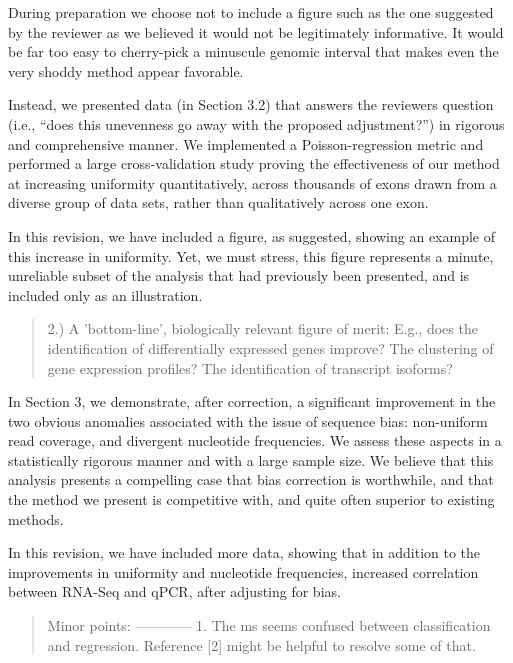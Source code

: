 \documentclass{article}
\begin{document}
During preparation we choose not to include a figure such as the one suggested
by the reviewer as we believed it would not be legitimately informative. It
would be far too easy to cherry-pick a minuscule genomic interval that makes
even the very shoddy method appear favorable.

Instead, we presented data (in Section 3.2) that answers the reviewers question
(i.e., ``does this unevenness go away with the proposed adjustment?'') in
rigorous and comprehensive manner. We implemented a Poisson-regression metric
and performed a large cross-validation study proving the effectiveness of our
method at increasing uniformity quantitatively, across thousands of exons drawn
from a diverse group of data sets, rather than qualitatively across one exon.

In this revision, we have included a figure, as suggested, showing an example of
this increase in uniformity. Yet, we must stress, this figure represents a
minute, unreliable subset of the analysis that had previously been presented,
and is included only as an illustration.


\begin{quote}
2.) A 'bottom-line', biologically relevant figure of merit: E.g., does
the identification of differentially expressed genes improve? The
clustering of gene expression profiles? The identification of
transcript isoforms?
\end{quote}

In Section 3, we demonstrate, after correction, a significant improvement in
the two obvious anomalies associated with the issue of sequence bias:
non-uniform read coverage, and divergent nucleotide frequencies. We assess these
aspects in a statistically rigorous manner and with a large sample size. We
believe that this analysis presents a compelling case that bias correction is
worthwhile, and that the method we present is competitive with, and quite often
superior to existing methods.

In this revision, we have included more data, showing that in addition to the
improvements in uniformity and nucleotide frequencies, increased correlation
between RNA-Seq and qPCR, after adjusting for bias.



\begin{quote}
Minor points:
------------
1. The ms seems confused between classification and regression.
Reference [2] might be helpful to resolve some of that.
\end{quote}
\end{document}
